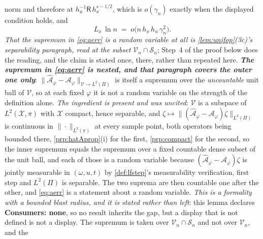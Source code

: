 \begin{lemma}
norm and therefore at $h_u^{-1}\mathsf R\,h_x^{s-1/2}$, which is $o(\gamma_n)$ exactly when the displayed
condition holds, and
\begin{equation}\label{eq:entropyA}
L_x\,\ln n\;=\;o\big(n\,h_x\,h_u\,\gamma_n^{2}\big) .
\end{equation}
\emph{That the supremum in \eqref{eq:aerr} is a random variable at all is \cref{lem:unifop}\textup{(3c)}'s
separability paragraph, read at the subset $\mathcal V_n\cap\mathcal S_n$}; Step~4 of the proof below does the
reading, and the claim is stated once, there, rather than repeated here.
\emph{\textbf{The supremum in \eqref{eq:aerr} is nested, and that paragraph covers the outer one only}}:
$\|\hat{\mathcal A}_\varphi-\mathcal A_\varphi\|_{\mathcal V\to L^{2}(\Pi)}$ is itself a supremum over the
\emph{uncountable} unit ball of $\mathcal V$, so at each fixed $\varphi$ it is not a random variable on the
strength of the definition alone. \emph{The ingredient is present and was uncited}: $\mathcal V$ is a
subspace of $L^{2}(\mathcal X,\pi)$ with $\mathcal X$ compact, hence separable, and
$\zeta\mapsto\|(\hat{\mathcal A}_\varphi-\mathcal A_\varphi)\zeta\|_{L^{2}(\Pi)}$ is continuous in
$\|\cdot\|_{L^{2}(\pi)}$ at every sample point, both operators being bounded there, 
\cref{prp:hatAprop}(i) for the first, \cref{prp:compact} for the second, so the inner supremum equals
the supremum over a fixed countable dense subset of the unit ball, and each of those is a random variable
because $(\hat{\mathcal A}_\varphi-\mathcal A_\varphi)\zeta$ is jointly measurable in $(\omega,u,t)$ by
\cref{def:lfstep}'s measurability verification, first step and $L^{2}(\Pi)$ is separable. The two suprema are then countable
one after the other, and \eqref{eq:aerr} is a statement about a random variable. \emph{This is a
formality with a bounded blast radius, and it is stated rather than left}: this lemma declares
\textbf{Consumers: none}, so no result inherits the gap, but a display that is not defined is not a
display.
The supremum is taken over $\mathcal V_n\cap\mathcal S_n$ and not over $\mathcal V_n$, and the

\end{lemma}
